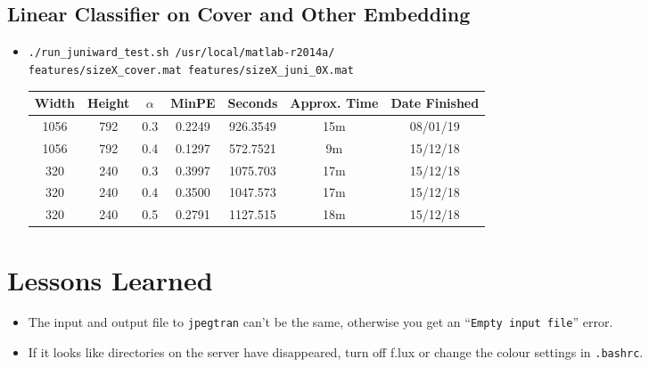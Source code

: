 \documentclass[11pt,a4paper]{report}
\begin{document}
\subsection{Linear Classifier on Cover and Other Embedding}
\begin{itemize}
\item \texttt{./run\_juniward\_test.sh /usr/local/matlab-r2014a/} \\
         \texttt{features/sizeX\_cover.mat features/sizeX\_juni\_0X.mat}
  \begin{center}
  \begin{tabular}{ c c | c | c | c c c }
  Width & Height & $\alpha$ & MinPE & Seconds & Approx. Time & Date Finished \\ \hline
  1056 & 792 & 0.3 & 0.2249 & 926.3549 & 15m & 08/01/19 \\
  1056 & 792 & 0.4 & 0.1297 & 572.7521 & 9m & 15/12/18 \\
  320 & 240 & 0.3 & 0.3997 & 1075.703 & 17m & 15/12/18 \\
  320 & 240 & 0.4 & 0.3500 & 1047.573 & 17m & 15/12/18 \\
  320 & 240 & 0.5 & 0.2791 & 1127.515 & 18m & 15/12/18 \\
  \end{tabular}
  \end{center}
\end{itemize}


\section{Lessons Learned}
\label{sec:lessons-learned}

\begin{itemize}

\item The input and output file to \texttt{jpegtran} can't be the same, otherwise you get an ``\texttt{Empty input file}'' error.

\item If it looks like directories on the server have disappeared, turn off f.lux or change the colour settings in \texttt{.bashrc}.

\end{itemize}
\end{document}
